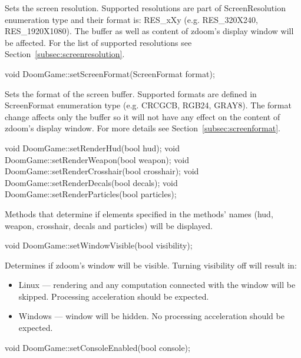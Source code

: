 	Sets the screen resolution. Supported resolutions are part of ScreenResolution enumeration type and their format is: RES\_xXy (e.g. RES\_320X240, RES\_1920X1080). The buffer as well as content of zdoom's display window will be affected. For the list of supported resolutions see Section~\ref{subsec:screenresolution}.


\vspace{20pt}
\begin{clinee}
void DoomGame::setScreenFormat(ScreenFormat format);
\end{clinee}
	
	Sets the format of the screen buffer. Supported formats are defined in ScreenFormat enumeration type (e.g. CRCGCB, RGB24, GRAY8). The format change affects only the buffer so it will not have any effect on the content of zdoom's display window. For more details see Section~\ref{subsec:screenformat}.


\vspace{20pt}
\begin{clinee}       
void DoomGame::setRenderHud(bool hud);
void DoomGame::setRenderWeapon(bool weapon);
void DoomGame::setRenderCrosshair(bool crosshair);
void DoomGame::setRenderDecals(bool decals);
void DoomGame::setRenderParticles(bool particles);
\end{clinee}

	Methods that determine if elements specified in the methods' names (hud, weapon, crosshair, decals and particles) will be displayed.


\vspace{20pt}
\begin{clinee}
void DoomGame::setWindowVisible(bool visibility);
\end{clinee}

	Determines if zdoom's window will be visible. Turning visibility off will result in:
	\begin{itemize}
		\item Linux --- rendering and any computation connected with the window will be skipped. Processing acceleration should be expected.
		\item Windows --- window will be hidden. No processing acceleration should be expected.
	\end{itemize}


\vspace{20pt}
\begin{clinee}
void DoomGame::setConsoleEnabled(bool console);
\end{clinee}


